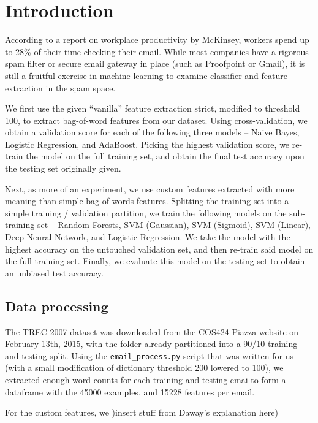 \documentclass{article} %
\begin{document}
\section{Introduction}
According to a report on workplace productivity by McKinsey, workers spend up to 28\% of their time checking their email.  While most companies have a rigorous spam filter or secure email gateway in place (such as Proofpoint or Gmail), it is still a fruitful exercise in machine learning to examine classifier and feature extraction in the spam space.\par 
We first use the given ``vanilla'' feature extraction strict, modified to threshold 100, to extract bag-of-word features from our dataset.  Using cross-validation, we obtain a validation score for each of the following three models -- Naive Bayes, Logistic Regression, and AdaBoost.  Picking the highest validation score, we re-train the model on the full training set, and obtain the final test accuracy upon the testing set originally given.\par 
Next, as more of an experiment, we use custom features extracted with more meaning than simple bag-of-words features.  Splitting the training set into a simple training / validation partition, we train the following models on the sub-training set -- Random Forests, SVM (Gaussian), SVM (Sigmoid), SVM (Linear), Deep Neural Network, and Logistic Regression.  We take the model with the highest accuracy on the untouched validation set, and then re-train said model on the full training set.  Finally, we evaluate this model on the testing set to obtain an unbiased test accuracy.
%
\subsection{Data processing}
The TREC 2007 dataset was downloaded from the COS424 Piazza website on February 13th, 2015, with the folder already partitioned into a 90/10 training and testing split.  Using the \lstinline{email_process.py}\lstinline{} script that was written for us (with a small modification of dictionary threshold 200 lowered to 100), we extracted enough word counts for each training and testing emai to form a dataframe with the 45000 examples, and 15228 features per email.\par 
For the custom features, we )insert stuff from Daway's explanation here)
\end{document}
